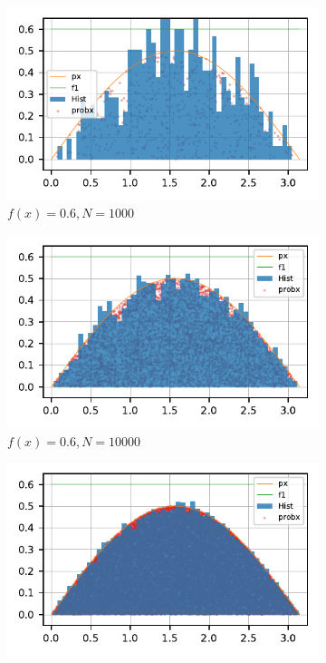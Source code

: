 \begin{figure}
  \centering
  \begin{subfigure}[b]{0.3\textwidth}
    \includegraphics[scale=.66]{CodeAndFigures/AcceptanceRejectionPlotf1N1000.pdf}
    \caption{$f(x)=0.6, N=1000$}
    \label{subfig:consN1000}
  \end{subfigure}
    \begin{subfigure}[b]{0.3\textwidth}
    \includegraphics[scale=.66]{CodeAndFigures/AcceptanceRejectionPlotf1N10000.pdf}
    \caption{$f(x)=0.6, N=10000$}
    \label{subfig:consN10000}
  \end{subfigure}
    \begin{subfigure}[b]{0.3\textwidth}
    \includegraphics[scale=.66]{CodeAndFigures/AcceptanceRejectionPlotf1N50000.pdf}

\end{subfigure}
\end{figure}
